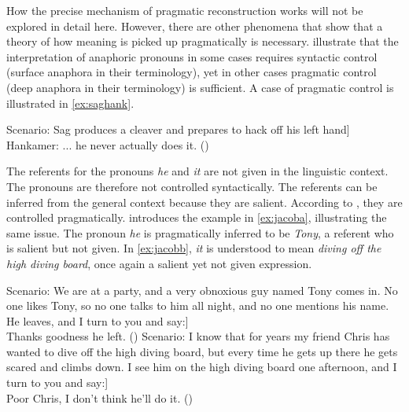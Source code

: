 How the precise mechanism of pragmatic reconstruction works will not be explored in detail here. However, there are other phenomena that show that a  theory of how meaning is picked up  pragmatically is necessary. \citet{Hankamer1976} illustrate that the interpretation of anaphoric pronouns in some cases requires syntactic control (surface anaphora in their terminology), yet  in  other cases pragmatic control (deep anaphora in their terminology) is sufficient. A case of pragmatic control is illustrated in \eqref{ex:saghank}.

\ea\label{ex:saghank} {\ob}Scenario: Sag produces a cleaver and prepares to hack off his left hand]\\
Hankamer: ... he never actually does it. (\citealt[392: ex 6b]{Hankamer1976})
\z

The referents for the pronouns \emph{he} and \emph{it} are not given in the  linguistic context. The pronouns are therefore not controlled syntactically. The referents  can be inferred from the general context because they are salient. According to \citet{Hankamer1976}, they are controlled pragmatically.  \citet{Jacobson2012} introduces the example in \eqref{ex:jacoba}, illustrating the same issue. The pronoun \emph{he} is pragmatically inferred to be \emph{Tony}, a referent who is salient but not given. In \eqref{ex:jacobb}, \emph{it} is understood to mean \emph{diving off the high diving board}, once again a salient yet not given expression.



\ea 
\ea\label{ex:jacoba} {\ob}Scenario:  We are at a party, and a very obnoxious guy named Tony comes in. No one  likes  Tony,  so  no  one  talks  to  him  all  night, and  no  one  mentions  his  name. He leaves, and I turn to you and say:] \\
Thanks goodness he left. (\citealt[4: ex 13]{Jacobson2012})
\ex\label{ex:jacobb} {\ob}Scenario:  I know that for years my friend Chris  has wanted to dive off the high diving board, but every time he gets up there he gets scared and climbs down.  I see him on the high diving board one afternoon, and I turn to you and say:]\\
 Poor Chris, I don’t think he’ll do it.   (\citealt[4: ex 14]{Jacobson2012})
 \z
\z

